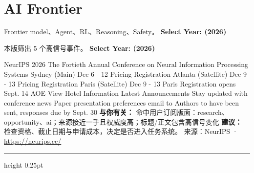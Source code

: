 \documentclass[10.5pt]{ctexart}
\begin{document}
\section*{AI Frontier}
{\color{ormuted} Frontier model、Agent、RL、Reasoning、Safety。}
\vspace{2mm}
{\LARGE\bfseries Select Year: (2026)}\par
\vspace{1mm}
{\color{ormuted} 本版筛出 5 个高信号事件。}
\vspace{3mm}
{\Large\bfseries Select Year: (2026)}\par
NeurIPS 2026 The Fortieth Annual Conference on Neural Information Processing Systems Sydney (Main) Dec 6 - 12 Pricing Registration Atlanta (Satellite) Dec 9 - 13 Pricing Registration Paris (Satellite) Dec 9 - 13 Paris Registration opens Sept. 14 AOE View Hotel Information Latest Announcements Stay updated with conference news Paper presentation preferences email to Authors to have been sent, responses due by Sept. 30
\textbf{与你有关：} 命中用户订阅版面：research、opportunity、ai；来源接近一手且权威度高；标题/正文包含高信号变化
\textbf{建议：} 检查资格、截止日期与申请成本，决定是否进入任务系统。
{\footnotesize\color{ormuted} 来源：NeurIPS · \url{https://neurips.cc/}}
\vspace{4mm}
\hrule height 0.25pt
\vspace{3mm}
\end{document}
